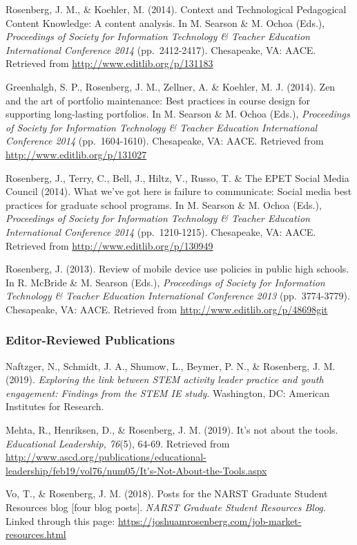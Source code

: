\documentclass[14,]{article}
\begin{document}
Rosenberg, J. M., \& Koehler, M. (2014). Context and Technological
Pedagogical Content Knowledge: A content analysis. In M. Searson \& M.
Ochoa (Eds.), \emph{Proceedings of Society for Information Technology \&
Teacher Education International Conference 2014} (pp.~2412-2417).
Chesapeake, VA: AACE. Retrieved from
\url{http://www.editlib.org/p/131183}

Greenhalgh, S. P., Rosenberg, J. M., Zellner, A. \& Koehler, M. J.
(2014). Zen and the art of portfolio maintenance: Best practices in
course design for supporting long-lasting portfolios. In M. Searson \&
M. Ochoa (Eds.), \emph{Proceedings of Society for Information Technology
\& Teacher Education International Conference 2014} (pp.~1604-1610).
Chesapeake, VA: AACE. Retrieved from
\url{http://www.editlib.org/p/131027}

Rosenberg, J., Terry, C., Bell, J., Hiltz, V., Russo, T. \& The EPET
Social Media Council (2014). What we've got here is failure to
communicate: Social media best practices for graduate school programs.
In M. Searson \& M. Ochoa (Eds.), \emph{Proceedings of Society for
Information Technology \& Teacher Education International Conference
2014} (pp.~1210-1215). Chesapeake, VA: AACE. Retrieved from
\url{http://www.editlib.org/p/130949}

Rosenberg, J. (2013). Review of mobile device use policies in public
high schools. In R. McBride \& M. Searson (Eds.), \emph{Proceedings of
Society for Information Technology \& Teacher Education International
Conference 2013} (pp.~3774-3779). Chesapeake, VA: AACE. Retrieved from
\url{http://www.editlib.org/p/48698git}

\subsubsection{Editor-Reviewed
Publications}\label{editor-reviewed-publications}

Naftzger, N., Schmidt, J. A., Shumow, L., Beymer, P. N., \& Rosenberg,
J. M. (2019). \emph{Exploring the link between STEM activity leader
practice and youth engagement: Findings from the STEM IE study}.
Washington, DC: American Institutes for Research.

Mehta, R., Henriksen, D., \& Rosenberg, J. M. (2019). It's not about the
tools. \emph{Educational Leadership, 76}(5), 64-69. Retrieved from
\url{http://www.ascd.org/publications/educational-leadership/feb19/vol76/num05/It's-Not-About-the-Tools.aspx}

Vo, T., \& Rosenberg, J. M. (2018). Posts for the NARST Graduate Student
Resources blog {[}four blog posts{]}. \emph{NARST Graduate Student
Resources Blog}. Linked through this page:
\url{https://joshuamrosenberg.com/job-market-resources.html}
\end{document}
